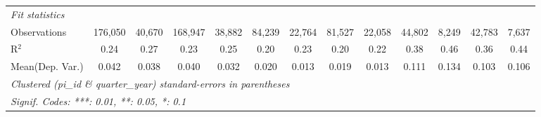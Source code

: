 \begin{tabular}{lcccccccccccc}
   \midrule
   \emph{Fit statistics}\\
   Observations                                               & 176,050        & 40,670        & 168,947        & 38,882       & 84,239         & 22,764       & 81,527        & 22,058       & 44,802        & 8,249         & 42,783        & 7,637\\  
   R$^2$                                                      & 0.24           & 0.27          & 0.23           & 0.25         & 0.20           & 0.23         & 0.20          & 0.22         & 0.38          & 0.46          & 0.36          & 0.44\\  
Mean(Dep. Var.) & 0.042 & 0.038 & 0.040 & 0.032 & 0.020 & 0.013 & 0.019 & 0.013 & 0.111 & 0.134 & 0.103 & 0.106 \\
   \midrule \midrule
   \multicolumn{13}{l}{\emph{Clustered (pi\_id \& quarter\_year) standard-errors in parentheses}}\\
   \multicolumn{13}{l}{\emph{Signif. Codes: ***: 0.01, **: 0.05, *: 0.1}}\\
\end{tabular}
\par\endgroup
